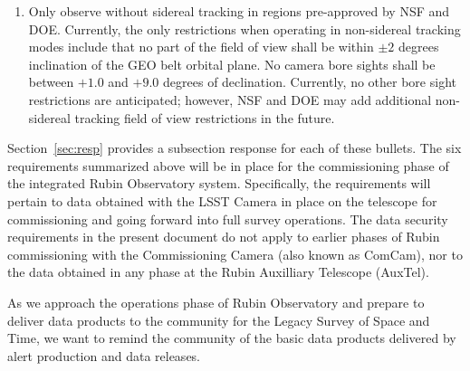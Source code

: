 \begin{enumerate}
\item	Only observe without sidereal tracking in regions pre-approved by \gls{NSF} and \gls{DOE}.
Currently, the only restrictions when operating in non-sidereal tracking modes include that no part of the field of view shall be within $\pm 2$ degrees  inclination of the \gls{GEO} belt orbital plane.
No \gls{camera} bore sights shall be between $+1.0$ and $+9.0$ degrees of declination.
Currently, no other bore sight restrictions are anticipated; however, \gls{NSF} and \gls{DOE} may add additional non-sidereal tracking field of view restrictions in the future.

\end{enumerate}
Section~\ref{sec:resp} provides a subsection response for each of these bullets.
The six requirements summarized above will be in place for the commissioning phase of the integrated Rubin Observatory system.
Specifically, the requirements will pertain to data obtained with the LSST Camera in place on the telescope for commissioning and going forward into full survey operations. 
The data security requirements in the present document do not apply to earlier phases of Rubin commissioning with the Commissioning Camera (also known as \gls{ComCam}), nor to the data obtained in any phase at the Rubin Auxilliary Telescope (AuxTel).


As we approach the operations phase of Rubin Observatory and prepare to deliver data products to the community for the Legacy Survey of Space and Time, we want to remind the community of the basic data products delivered by alert production and data releases.

